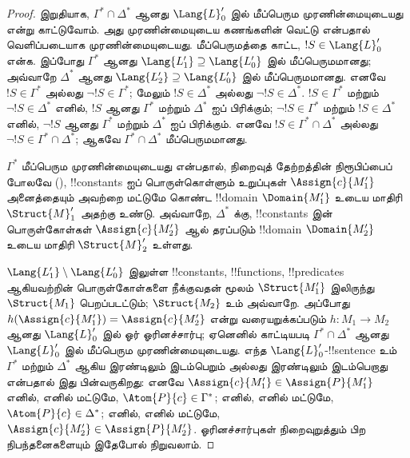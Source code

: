 \documentclass[../../../include/open-logic-section]{subfiles}
\begin{document}
\begin{proof}
இறுதியாக, $\Gamma^* \cap \Delta^*$ ஆனது $\Lang{L}'_0$ இல்
மீப்பெரும முரணின்மையுடையது என்று காட்டுவோம். அது முரணின்மையுடைய
கணங்களின் வெட்டு என்பதால் வெளிப்படையாக முரணின்மையுடையது.
மீப்பெருமத்தை காட்ட, $!S \in
\Lang{L}'_0$ என்க. இப்போது $\Gamma^*$ ஆனது $\Lang{L'_1}
\supseteq \Lang{L'_0}$ இல் மீப்பெருமமானது; அவ்வாறே $\Delta^*$ ஆனது
$\Lang{L'_2} \supseteq \Lang{L'_0}$ இல் மீப்பெருமமானது. எனவே
$!S \in \Gamma^*$ அல்லது $\lnot !S \in \Gamma^*$; மேலும்
$!S \in \Delta^*$ அல்லது $\lnot !S \in \Delta^*$. $!S \in
\Gamma^*$ மற்றும் $\lnot !S \in \Delta^*$ எனில், $!S$ ஆனது
$\Gamma^*$ மற்றும் $\Delta^*$ ஐப் பிரிக்கும்; $\lnot !S \in
\Gamma^*$ மற்றும் $!S \in \Delta^*$ எனில், $\lnot !S$ ஆனது
$\Gamma^*$ மற்றும் $\Delta^*$ ஐப் பிரிக்கும். எனவே $!S \in
\Gamma^* \cap \Delta^*$ அல்லது $\lnot !S \in \Gamma^* \cap \Delta^*$;
ஆகவே $\Gamma^* \cap \Delta^*$ மீப்பெருமமானது.

$\Gamma^*$ மீப்பெரும முரணின்மையுடையது என்பதால், நிறைவுத் தேற்றத்தின்
நிரூபிப்பைப் போலவே (),
!!{constant}s ஐப் பொருள்கொள்ளும் உறுப்புகள் $\Assign{c}{M'_1}$
அனைத்தையும் அவற்றை மட்டுமே கொண்ட !!{domain} $\Domain{M'_1}$ உடைய
மாதிரி $\Struct{M}'_1$ அதற்கு உண்டு. அவ்வாறே, $\Delta^*$ க்கு,
!!{constant}s இன் பொருள்கோள்கள் $\Assign{c}{M'_2}$ ஆல் தரப்படும்
!!{domain} $\Domain{M'_2}$ உடைய மாதிரி $\Struct{M}'_2$ உள்ளது.

$\Lang{L'_1} \setminus \Lang{L'_0}$ இலுள்ள !!{constant}s,
!!{function}s, !!{predicate}s ஆகியவற்றின் பொருள்கோள்களை நீக்குவதன்
மூலம் $\Struct{M'_1}$ இலிருந்து $\Struct{M_1}$ பெறப்படட்டும்;
$\Struct{M_2}$ உம் அவ்வாறே. அப்போது
$h(\Assign{c}{M'_1}) = \Assign{c}{M'_2}$ என்று வரையறுக்கப்படும்
$h \colon M_1 \to M_2$ ஆனது $\Lang{L}'_0$ இல் ஓர் ஓரினச்சார்பு;
ஏனெனில் காட்டியபடி $\Gamma^* \cap \Delta^*$ ஆனது $\Lang{L}'_0$
இல் மீப்பெரும முரணின்மையுடையது. எந்த $\Lang{L}'_0$-!!{sentence} உம்
$\Gamma^*$ மற்றும் $\Delta^*$ ஆகிய இரண்டிலும் இடம்பெறும் அல்லது
இரண்டிலும் இடம்பெறாது என்பதால் இது பின்வருகிறது: எனவே
$\Assign{c}{M'_1} \in
\Assign{P}{M'_1}$ எனில், எனில் மட்டுமே, $\Atom{P}{c} \in \Gamma^*$;
எனில், எனில் மட்டுமே, $\Atom{P}{c} \in \Delta^*$; எனில், எனில்
மட்டுமே, $\Assign{c}{M'_2} \in
\Assign{P}{M'_2}$. ஓரினச்சார்புகள் நிறைவுறுத்தும் பிற நிபந்தனைகளையும்
இதேபோல் நிறுவலாம்.


\end{proof}
\end{document}
